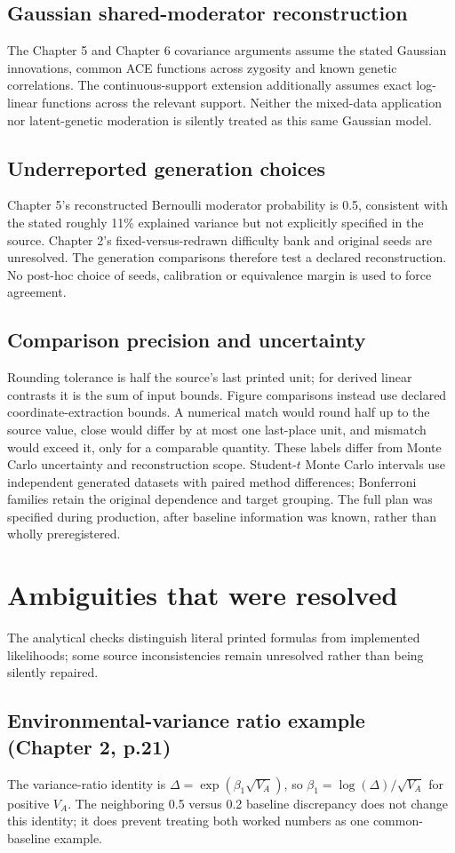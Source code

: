 \documentclass[11pt]{article}
\begin{document}
\subsection{Gaussian shared-moderator reconstruction}
The Chapter 5 and Chapter 6 covariance arguments assume the stated Gaussian innovations, common ACE functions across zygosity and known genetic correlations. The continuous-support extension additionally assumes exact log-linear functions across the relevant support. Neither the mixed-data application nor latent-genetic moderation is silently treated as this same Gaussian model.
\subsection{Underreported generation choices}
Chapter 5's reconstructed Bernoulli moderator probability is 0.5, consistent with the stated roughly 11\% explained variance but not explicitly specified in the source. Chapter 2's fixed-versus-redrawn difficulty bank and original seeds are unresolved. The generation comparisons therefore test a declared reconstruction. No post-hoc choice of seeds, calibration or equivalence margin is used to force agreement.
\subsection{Comparison precision and uncertainty}
Rounding tolerance is half the source's last printed unit; for derived linear contrasts it is the sum of input bounds. Figure comparisons instead use declared coordinate-extraction bounds. A numerical match would round half up to the source value, close would differ by at most one last-place unit, and mismatch would exceed it, only for a comparable quantity. These labels differ from Monte Carlo uncertainty and reconstruction scope. Student-$t$ Monte Carlo intervals use independent generated datasets with paired method differences; Bonferroni families retain the original dependence and target grouping. The full plan was specified during production, after baseline information was known, rather than wholly preregistered.

\section{Ambiguities that were resolved}
The analytical checks distinguish literal printed formulas from implemented likelihoods; some source inconsistencies remain unresolved rather than being silently repaired.
\subsection{Environmental-variance ratio example (Chapter 2, p.21)}
The variance-ratio identity is $\Delta=\exp(\beta_1\sqrt{V_A})$, so $\beta_1=\log(\Delta)/\sqrt{V_A}$ for positive $V_A$. The neighboring 0.5 versus 0.2 baseline discrepancy does not change this identity; it does prevent treating both worked numbers as one common-baseline example.
\end{document}
